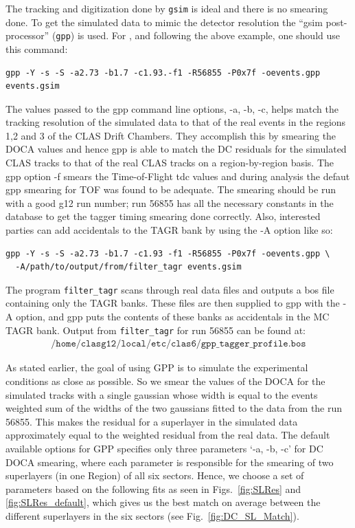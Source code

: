 The tracking and digitization done by \texttt{gsim} is ideal and there is no smearing done. To get the simulated data to mimic the detector resolution the ``gsim post-processor'' (\texttt{gpp}) is used. For , and following the above example, one should use this command:
\begin{verbatim}
gpp -Y -s -S -a2.73 -b1.7 -c1.93.-f1 -R56855 -P0x7f -oevents.gpp events.gsim
\end{verbatim}
The values passed to the gpp command line options, -a, -b, -c, helps match the tracking resolution of the simulated data to that of the real events in the regions 1,2 and 3 of the CLAS Drift Chambers. They accomplish this by smearing the DOCA values and hence gpp is able to match the DC residuals for the simulated CLAS tracks to that of the real CLAS tracks on a region-by-region basis. The gpp option -f smears the Time-of-Flight tdc values and during analysis the defaut gpp smearing for TOF was found to be adequate. The smearing should be run with a good g12 run number; run 56855 has all the necessary constants in the database to get the tagger timing smearing done correctly. Also, interested parties can add accidentals to the TAGR bank by using the -A option like so:
\begin{verbatim}
gpp -Y -s -S -a2.73 -b1.7 -c1.93 -f1 -R56855 -P0x7f -oevents.gpp \
  -A/path/to/output/from/filter_tagr events.gsim
\end{verbatim}
The program \texttt{filter\_tagr} scans through real data files and outputs a bos file containing only the TAGR banks. These files are then supplied to gpp with the -A option, and gpp puts the contents of these banks as accidentals in the MC TAGR bank. Output from \texttt{filter\_tagr} for run 56855 can be found at:
\begin{align}
    \texttt{/home/clasg12/local/etc/clas6/gpp\_tagger\_profile.bos} \nonumber
\end{align}


As stated earlier, the goal of using GPP is to simulate the experimental conditions as close as possible. So we smear the values of the DOCA for the simulated tracks with a single gaussian whose width is equal to the events weighted sum of the widths of the two gaussians fitted to the data from the run 56855. This makes the residual for a superlayer in the simulated data approximately equal to the weighted residual from the real data. The default available options for GPP specifies only three parameters `-a, -b, -c' for DC DOCA smearing, where each parameter is responsible for the smearing of two superlayers (in one Region) of all six sectors. Hence, we choose a set of parameters based on the following fits as seen in Figs.~\ref{fig:SLRes} and \ref{fig:SLRes_default}, which gives us the best match on average between the different superlayers in the six sectors (see Fig.~\ref{fig:DC_SL_Match}).

